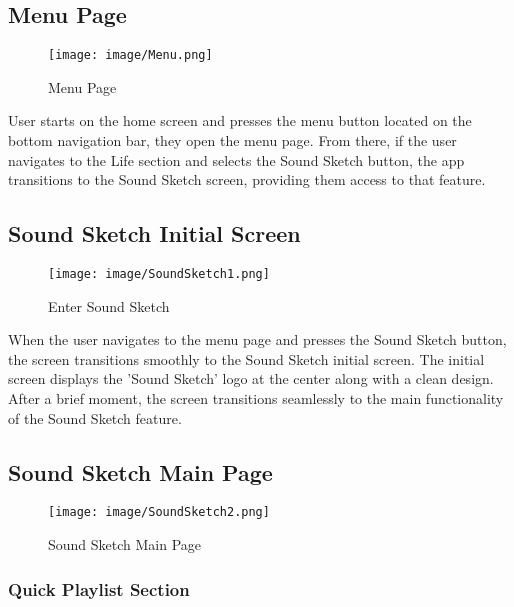 \documentclass[conference]{IEEEtran}
\begin{document}
\subsection{Menu Page}

\begin{figure}[h!]
    \centering
    \texttt{[image: image/Menu.png]}
    \caption{Menu Page}
    \label{fig:enter-label}
\end{figure}

\noindent User starts on the home screen and presses the menu button located on the bottom navigation bar, they open the menu page. From there, if the user navigates to the Life section and selects the Sound Sketch button, the app transitions to the Sound Sketch screen, providing them access to that feature. \\

\subsection{Sound Sketch Initial Screen}


\begin{figure}[h!]
    \centering
    \texttt{[image: image/SoundSketch1.png]}
    \caption{Enter Sound Sketch}
    \label{fig:enter-label}
\end{figure}

\noindent 
When the user navigates to the menu page and presses the Sound Sketch button, the screen transitions smoothly to the Sound Sketch initial screen. The initial screen displays the 'Sound Sketch' logo at the center along with a clean design. After a brief moment, the screen transitions seamlessly to the main functionality of the Sound Sketch feature. \\

\subsection{Sound Sketch Main Page}

\begin{figure}[h!]
    \centering
    \texttt{[image: image/SoundSketch2.png]}
    \caption{Sound Sketch Main Page}
    \label{fig:enter-label}
\end{figure}

\subsubsection{Quick Playlist Section}
\end{document}
